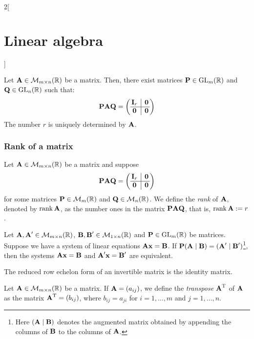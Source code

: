\documentclass[../../../main_math.tex]{subfiles}
\begin{document}
\begin{multicols}{2}[\section{Linear algebra}]
\begin{theorem}
  \end{theorem}
  \begin{theorem}
    Let $\boldsymbol{\mathrm{A}}\in\mathcal{M}_{m\times n}(\mathbb{R})$ be a matrix. Then, there exist matrices $\boldsymbol{\mathrm{P}}\in\mathrm{GL}_m(\mathbb{R})$ and $\boldsymbol{\mathrm{Q}}\in\mathrm{GL}_n(\mathbb{R})$ such that:
    $$\vf{P}\vf{A}\vf{Q}=\left(
      \begin{array}{@{\,} c|c @{\,}}
          \vf{I}_r & \vf{0} \\
          \hline
          \vf{0}   & \vf{0}
        \end{array}
      \right)$$
    The number $r$ is uniquely determined by $\boldsymbol{\mathrm{A}}$.
  \end{theorem}
  \subsubsection{Rank of a matrix}
  \begin{definition}[Rank]
    Let $\boldsymbol{\mathrm{A}}\in\mathcal{M}_{m\times n}(\mathbb{R})$ be a matrix and suppose
    $$\vf{P}\vf{A}\vf{Q}=\left(
      \begin{array}{@{\,} c|c @{\,}}
          \vf{I}_r & \vf{0} \\
          \hline
          \vf{0}   & \vf{0}
        \end{array}
      \right)$$ for some matrices $\boldsymbol{\mathrm{P}}\in\mathcal{M}_m(\mathbb{R})$ and $\boldsymbol{\mathrm{Q}}\in\mathcal{M}_n(\mathbb{R})$. We define the \emph{rank} of $\boldsymbol{\mathrm{A}}$, denoted by $\rank \boldsymbol{\mathrm{A}}$, as the number ones in the matrix $\boldsymbol{\mathrm{P}}\boldsymbol{\mathrm{A}}\boldsymbol{\mathrm{Q}}$, that is, $\rank\boldsymbol{\mathrm{A}}:=r$.
  \end{definition}
  \begin{proposition}
    Let $\boldsymbol{\mathrm{A}},\boldsymbol{\mathrm{A}}'\in\mathcal{M}_{m\times n}(\mathbb{R})$, $\boldsymbol{\mathrm{B}},\boldsymbol{\mathrm{B}}'\in\mathcal{M}_{1\times n}(\mathbb{R})$ and $\boldsymbol{\mathrm{P}}\in\mathrm{GL}_m(\mathbb{R})$ be matrices. Suppose we have a system of linear equations $\boldsymbol{\mathrm{A}}\boldsymbol{\mathrm{x}}=\boldsymbol{\mathrm{B}}$. If $\boldsymbol{\mathrm{P}}(\boldsymbol{\mathrm{A}}\mid\boldsymbol{\mathrm{B}})=(\boldsymbol{\mathrm{A}}'\mid\boldsymbol{\mathrm{B}}')$\footnote{Here $(\boldsymbol{\mathrm{A}}\mid\boldsymbol{\mathrm{B}})$ denotes the augmented matrix obtained by appending the columns of $\boldsymbol{\mathrm{B}}$ to the columns of $\boldsymbol{\mathrm{A}}$.}, then the systems $\boldsymbol{\mathrm{A}}\boldsymbol{\mathrm{x}}=\boldsymbol{\mathrm{B}}$ and $\boldsymbol{\mathrm{A}}'\boldsymbol{\mathrm{x}}=\boldsymbol{\mathrm{B}}'$ are equivalent.
  \end{proposition}
  \begin{corollary}
    The reduced row echelon form of an invertible matrix is the identity matrix.
  \end{corollary}
  \begin{definition}[Transposition]
    Let $\boldsymbol{\mathrm{A}}\in\mathcal{M}_{m\times n}(\mathbb{R})$ be a matrix. If $\boldsymbol{\mathrm{A}}=(a_{ij})$, we define the \emph{transpose} ${\boldsymbol{\mathrm{A}}}^{\mathrm{T}}$ of $\boldsymbol{\mathrm{A}}$ as the matrix ${\boldsymbol{\mathrm{A}}}^{\mathrm{T}}=(b_{ij})$, where $b_{ij}=a_{ji}$ for $i=1,\ldots,m$ and $j=1,\ldots,n$.

\end{definition}
\end{multicols}
\end{document}
